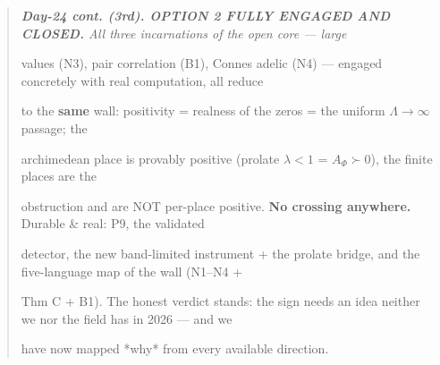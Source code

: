 \documentclass[10pt]{article}
\begin{document}
\begin{quote}\itshape
\textbf{Day-24 cont. (3rd). OPTION 2 FULLY ENGAGED AND CLOSED.} All three incarnations of the open core --- large\par
values (N3), pair correlation (B1), Connes adelic (N4) --- engaged concretely with real computation, all reduce\par
to the \textbf{same} wall: positivity = realness of the zeros = the uniform $\Lambda\to\infty$ passage; the\par
archimedean place is provably positive (prolate $\lambda<1$ = $A_\Phi\succ0$), the finite places are the\par
obstruction and are NOT per-place positive. \textbf{No crossing anywhere.} Durable \& real: P9, the validated\par
detector, the new band-limited instrument + the prolate bridge, and the five-language map of the wall (N1--N4 +\par
Thm C + B1). The honest verdict stands: the sign needs an idea neither we nor the field has in 2026 --- and we\par
have now mapped *why* from every available direction.\par
\end{quote}
\end{document}

